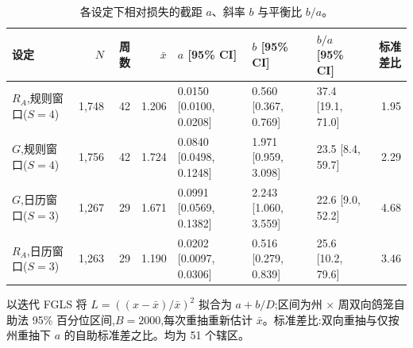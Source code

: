 \begin{table}[htbp]
\centering
\footnotesize
\caption{各设定下相对损失的截距 $a$、斜率 $b$ 与平衡比 $b/a$。}
\label{tab:s1}
\begin{tabular}{lrrrlllr}
\toprule
设定 & $N$ & 周数 & $\bar{x}$ & $a$ [95\% CI] & $b$ [95\% CI] & $b/a$ [95\% CI] & 标准差比 \\
\midrule
$R_A$,规则窗口($S=4$) & 1{,}748 & 42 & 1.206 & 0.0150 [0.0100, 0.0208] & 0.560 [0.367, 0.769] & 37.4 [19.1, 71.0] & 1.95 \\
$G$,规则窗口($S=4$) & 1{,}756 & 42 & 1.724 & 0.0840 [0.0498, 0.1248] & 1.971 [0.959, 3.098] & 23.5 [8.4, 59.7] & 2.29 \\
$G$,日历窗口($S=3$) & 1{,}267 & 29 & 1.671 & 0.0991 [0.0569, 0.1382] & 2.243 [1.060, 3.559] & 22.6 [9.0, 52.2] & 4.68 \\
$R_A$,日历窗口($S=3$) & 1{,}263 & 29 & 1.190 & 0.0202 [0.0097, 0.0306] & 0.516 [0.279, 0.839] & 25.6 [10.2, 79.6] & 3.46 \\
\bottomrule
\end{tabular}
\par\smallskip
\begin{minipage}{0.95\linewidth}\scriptsize 以迭代 FGLS 将 $L=((x-\bar{x})/\bar{x})^2$ 拟合为 $a+b/D$;区间为州 $\times$ 周双向鸽笼自助法 95\% 百分位区间,$B=2000$,每次重抽重新估计 $\bar{x}$。标准差比:双向重抽与仅按州重抽下 $a$ 的自助标准差之比。均为 51 个辖区。\end{minipage}
\end{table}
